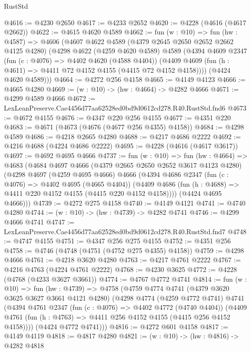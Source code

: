 \begin{lexlean}{RustStd}
\begin{coremodule}
@4616 := @4230 @2650
@4617 := @4233 @2652
@4620 := @4228 (@4616 (@4617 @2662))
@4622 := @4615 @4620 @4589
@4662 := fun (w : @10) =>
  fun (hw : @4587) =>
  @4606
    (@4607
      @4622
      @4589
      (@4379 @2645 @2650 @2652 @2662 @4125 @4280)
      (@4298
        @4622
        (@4259 @4620 @4589)
        @4589
        (@4394
          @4609
          @2347
          (fun (c : @4076) => @4402 @4620 (@4588 @4404))
          (@4409 @4609 (fun (h : @4611) => @4411 @72 @4152 @4155 (@4415 @72 @4152 @4158))))
        (@4424 @4620 @4589)))
@4664 := @4272 @256 @4158
@4665 := @4149 @4123
@4666 := @4665 @4280
@4669 := (w : @10) -> (hw : @4664) -> @4282 @4666
@4671 := @4299 @4589 @4666
@4672 := LexLeanPreserve.Cae4456d77aa62528ed0bd9d0612cd278.R40.RustStd.fnd6
@4673 := @4672 @4155
@4676 := @4347 @220 @256 @4155
@4677 := @4351 @220
@4683 := @4671 (@4673 (@4676 (@4677 @256 @4355) @4158))
@4684 := @4298 @4589
@4686 := @4218 @2665 @4280
@4688 := @4217 @4686 @2222
@4692 := @4216 @4688 (@4224 @4686 @2222)
@4695 := @4228 (@4616 (@4617 @3617))
@4697 := @4692 @4695 @4666
@4737 := fun (w : @10) =>
  fun (hw : @4664) =>
  @4683
    (@4684
      @4697
      @4666
      (@4379 @2665 @2650 @2652 @3617 @4123 @4280)
      (@4298
        @4697
        (@4259 @4695 @4666)
        @4666
        (@4394
          @4686
          @2347
          (fun (c : @4076) => @4402 @4695 (@4665 @4404))
          (@4409 @4686 (fun (h : @4688) => @4411 @220 @4152 @4155 (@4415 @220 @4152 @4158))))
        (@4424 @4695 @4666)))
@4739 := @4272 @275 @4158
@4740 := @4149 @4121
@4741 := @4740 @4280
@4744 := (w : @10) -> (hw : @4739) -> @4282 @4741
@4746 := @4299 @4666 @4741
@4747 := LexLeanPreserve.Cae4456d77aa62528ed0bd9d0612cd278.R40.RustStd.fnd7
@4748 := @4747 @4155
@4751 := @4347 @256 @275 @4155
@4752 := @4351 @256
@4758 := @4746 (@4748 (@4751 (@4752 @275 @4355) @4158))
@4759 := @4298 @4666
@4761 := @4218 @3620 @4280
@4763 := @4217 @4761 @2222
@4767 := @4216 @4763 (@4224 @4761 @2222)
@4768 := @4230 @3625
@4772 := @4228 (@4768 (@4233 @3627 @3661))
@4774 := @4767 @4772 @4741
@4814 := fun (w : @10) =>
  fun (hw : @4739) =>
  @4758
    (@4759
      @4774
      @4741
      (@4379 @3620 @3625 @3627 @3661 @4121 @4280)
      (@4298
        @4774
        (@4259 @4772 @4741)
        @4741
        (@4394
          @4761
          @2347
          (fun (c : @4076) => @4402 @4772 (@4740 @4404))
          (@4409 @4761 (fun (h : @4763) => @4411 @256 @4152 @4155 (@4415 @256 @4152 @4158))))
        (@4424 @4772 @4741)))
@4816 := @4272 @601 @4158
@4817 := @4149 @4119
@4818 := @4817 @4280
@4821 := (w : @10) -> (hw : @4816) -> @4282 @4818

\end{coremodule}
\end{lexlean}
